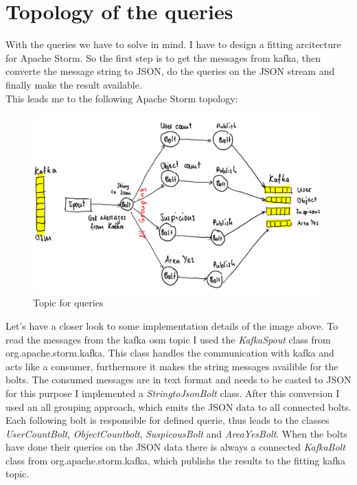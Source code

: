 \newpage
\section{Topology of the queries}
With the queries we have to solve in mind. I have to design a fitting arcitecture for Apache Storm.
So the first step is to get the messages from kafka, then converte the message string to JSON,
do the queries on the JSON stream and finally make the result available.\\
\medskip
This leads me to the following Apache Storm topology:
\begin{figure}[H]
\centering
\captionsetup{justification=centering}
\includegraphics[width=1.0\textwidth]{images/impl_topic.png}
\caption[Topic for queries]{Topic for queries}
\end{figure}
Let's have a closer look to some implementation details of the image above.
To read the messages from the kafka osm topic I used the \textit{KafkaSpout} class from org.apache.storm.kafka.
This class handles the communication with kafka and acts like a consumer, furthermore it makes the string messages availible for the bolts.
The consumed messages are in text format and needs to be casted to JSON for this purpose I implemented a \textit{StringtoJsonBolt} class.
After this conversion I used an all grouping approach, which emits the JSON data to all connected bolts.
Each following bolt is responsible for defined querie, thus leads to the classes \textit{UserCountBolt}, \textit{ObjectCountbolt}, \textit{SuspicousBolt} and \textit{AreaYesBolt}.
When the bolts have done their queries on the JSON data there is always a connected \textit{KafkaBolt} class from org.apache.storm.kafka,
which publishs the results to the fitting kafka topic.

